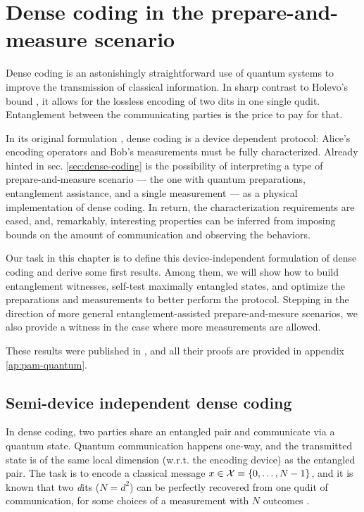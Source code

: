 \chapter{Dense coding in the prepare-and-measure scenario}
\label{chap:pam-quantum}

    Dense coding is an astonishingly straightforward use of quantum systems to improve the transmission of classical information. In sharp contrast to Holevo's bound \cite{holevo-bound-1973}, it allows for the lossless encoding of two dits in one single qudit. Entanglement between the communicating parties is the price to pay for that.

    In its original formulation \cite{bennett_1992_superdense}, dense coding is a device dependent protocol: Alice's encoding operators and Bob's measurements must be fully characterized. Already hinted in sec. \ref{sec:dense-coding} is the possibility of interpreting a type of prepare-and-measure scenario --- the one with quantum preparations, entanglement assistance, and a single measurement --- as a physical implementation of dense coding. In return, the characterization requirements are eased, and, remarkably, interesting properties can be inferred from imposing bounds on the amount of communication and observing the behaviors.

    Our task in this chapter is to define this device-independent formulation of dense coding and derive some first results. Among them, we will show how to build entanglement witnesses, self-test maximally entangled states, and optimize the preparations and measurements to better perform the protocol. Stepping in the direction of more general entanglement-assisted prepare-and-mesure scenarios, we also provide a witness in the case where more measurements are allowed.

    These results were published in \cite{moreno_pamdense_2021}, and all their proofs are provided in appendix \ref{ap:pam-quantum}.


    \section{Semi-device independent dense coding}
        In dense coding, two parties share an entangled pair and communicate via a quantum state. Quantum communication happens one-way, and the transmitted state is of the same local dimension (w.r.t. the encoding device) as the entangled pair. The task is to encode a classical message $x \in \mathcal{X} \equiv \{ 0, \ldots, N-1 \}$, and it is known that two \emph{d}its ($N = d^2$) can be perfectly recovered from one qudit of communication, for some choices of a measurement with $N$ outcomes \cite{}.
    

